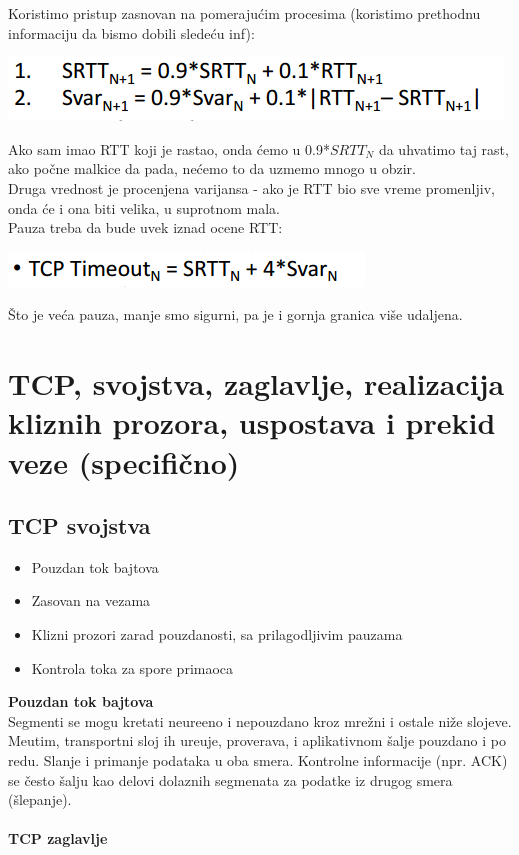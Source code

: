 \documentclass{article} %
\begin{document}
 Koristimo pristup zasnovan na pomerajućim procesima (koristimo prethodnu informaciju da bismo dobili sledeću inf):
 \begin{center}
	\includegraphics[scale=0.5]{retr4}
\end{center}
Ako sam imao RTT koji je rastao, onda ćemo u 0.9*$SRTT_{N}$ da uhvatimo taj rast, ako počne malkice da pada, nećemo to da uzmemo mnogo u obzir.\\
Druga vrednost je procenjena varijansa - ako je RTT bio sve vreme promenljiv, onda će i ona biti velika, u suprotnom mala.\\
Pauza treba da bude uvek iznad ocene RTT:
 \begin{center}
	\includegraphics[scale=0.5]{retr5}
\end{center}
Što je veća pauza, manje smo sigurni, pa je i gornja granica više udaljena.
\section{TCP, svojstva, zaglavlje, realizacija kliznih prozora, uspostava i prekid veze (specifično)}


\subsection{TCP svojstva}
\begin{itemize}
	\item Pouzdan tok bajtova
	\item Zasovan na vezama
	\item Klizni prozori zarad pouzdanosti, sa prilagodljivim pauzama
	\item Kontrola toka za spore primaoca 
\end{itemize}

\noindent\textbf{Pouzdan tok bajtova}
\\
Segmenti se mogu kretati neure\dj eno i nepouzdano kroz mre\v zni i ostale ni\v ze slojeve. Me\dj utim, transportni sloj ih ure\dj uje, proverava, i aplikativnom \v salje pouzdano i po redu. Slanje i primanje podataka u oba smera. Kontrolne informacije (npr. ACK) se \v cesto \v salju kao delovi dolaznih segmenata za podatke iz drugog smera (\v slepanje).
\\
\\ \textbf{TCP zaglavlje}
\end{document}
